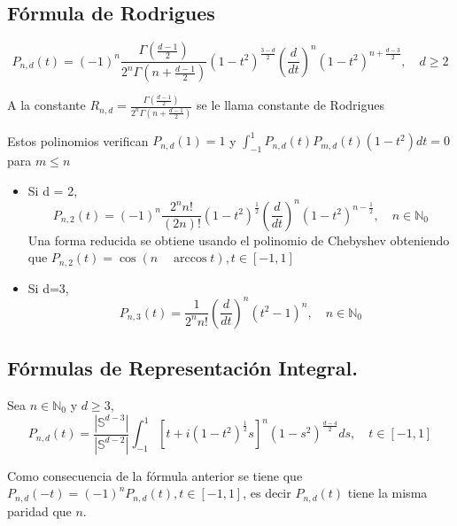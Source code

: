 \subsection{Fórmula de Rodrigues}
\begin{thm}
	$$P_{n,d}(t) = (-1)^n \frac{\Gamma(\frac{d-1}{2}) }{2^n\Gamma(n+\frac{d-1}{2})}(1-t^2)^{\frac{3-d}{2}}(\frac{d}{dt})^n (1-t^2)^{n+\frac{d-3}{2}}, \quad d\ge2
	$$
\end{thm}
\begin{rem}\label{cte_Rod}
	A la constante $R_{n,d} = \frac{\Gamma(\frac{d-1}{2})}{2^n\Gamma(n+\frac{d-1}{2})}$ se le llama constante de Rodrigues
\end{rem}
\begin{rem}
	Estos polinomios verifican $P_{n,d}(1)=1$ y $\int_{-1}^{1} P_{n,d}(t)P_{m,d}(t)(1-t^2) dt= 0$ para $m\le n$
\end{rem}
\begin{example}
	\begin{itemize}
		\item Si d = 2, $$P_{n,2}(t) = (-1)^n \frac{2^n n!} {(2n)!}(1-t^2)^{\frac{1}{2}}(\frac{d}{dt})^n (1-t^2)^{n-\frac{1}{2}}, \quad n\in \mathds{N}_0$$ Una forma reducida se obtiene usando el polinomio de Chebyshev obteniendo que $P_{n,2}(t) = \cos(n \quad \arccos{t}), t\in[-1,1]$
		\item Si d=3, $$P_{n,3}(t) = \frac{1} {2^n n!}(\frac{d}{dt})^n (t^2-1)^{n}, \quad n\in \mathds{N}_0$$
	\end{itemize}
\end{example}
\subsection{Fórmulas de Representación Integral.}
\begin{thm}Sea $n\in\mathds{N}_0$ y $d\ge3$, $$ 
	P_{n,d}(t) = \frac{|\mathds{S}^{d-3}|}{|\mathds{S}^{d-2}|}\int_{-1}^{1}[t+i(1-t^2)^{\frac{1}{2}}s]^n(1-s^2)^{\frac{d-4}{2}} ds, \quad t\in[-1,1]
	$$
\end{thm}
\begin{rem}Como consecuencia de la fórmula anterior se tiene que $P_{n,d}(-t) = (-1)^n P_{n,d}(t), t\in[-1,1]$, es decir $P_{n,d}(t)$ tiene la misma paridad que $n$.
\end{rem}
